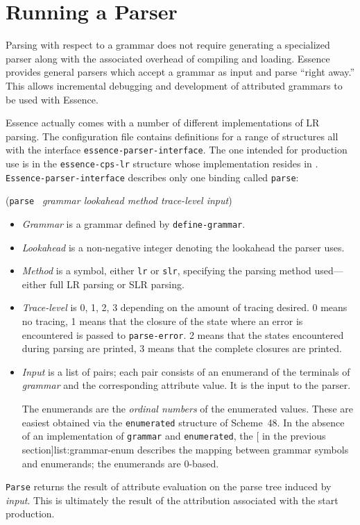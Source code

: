 \documentclass{article}
\renewcommand{\var}[1]{\noindent\mbox{\textit{#1}}}
\newcommand{\ide}[1]{{\frenchspacing\textnormal{\texttt{#1}}}}
\newcommand{\pproto}[2]{\unskip%
\mbox{\texonly{\spaceskip=0.5em}#1}%
\mbox{ }\texonly{\nobreak}\htmlonly{ }\textrm{#2}}
\newcommand{\proto}[3]{\par\bigskip\begin{flushleft}\pproto{(\texttt{#1}}{\textit{#2})}\hspace*{\fill}{#3}\end{flushleft}}
\newcommand{\codefont}[1]{\texttt{#1}}
\begin{document}
\section{Running a Parser}
\label{sec:running-a-parser}

Parsing with respect to a grammar does not require generating a
specialized parser along with the associated overhead of compiling and
loading.  Essence provides general parsers which accept a grammar as
input and parse ``right away.''  This allows incremental debugging and 
development of attributed grammars to be used with Essence.

Essence actually comes with a number of different implementations of
LR parsing.  The  configuration file contains
definitions for a range of structures all with the interface
\codefont{essence-parser-interface}.  The one intended for production use is in the
\codefont{essence-cps-lr} structure whose implementation resides in
.  \codefont{Essence-parser-interface} describes only 
one binding called \codefont{parse}:

\label{proc:parse}
\proto{parse}{grammar lookahead method trace-level input}{procedure}
%
\begin{itemize}
\item \var{Grammar} is a grammar defined by \codefont{define-grammar}.
\item \var{Lookahead} is a non-negative integer denoting the
  lookahead the parser uses.
\item \var{Method} is a symbol, either \codefont{lr} or
  \codefont{slr}, specifying the parsing method used---either full LR
  parsing or SLR parsing.
\item \var{Trace-level} is 0, 1, 2, 3 depending on the amount of
  tracing desired.  0 means no tracing, 1 means that the closure of
  the state where an error is encountered is passed to
  \ide{parse-error}.  2 means that the states encountered during
  parsing are printed, 3 means that the complete closures are printed.
\item \var{Input} is a list of pairs; each pair consists of an
  enumerand of the terminals of \var{grammar} and the corresponding attribute value.  It is the
  input to the parser. 
  
  The enumerands are the \emph{ordinal numbers} of the enumerated
  values.  These are easiest obtained via the \codefont{enumerated} structure
  of Scheme~48.  In the absence of an implementation of \codefont{grammar} and
  \codefont{enumerated}, the [ in the previous
  section]{list:grammar-enum} describes the mapping between grammar symbols and
  enumerands; the enumerands are 0-based.
\end{itemize}
%
\ide{Parse} returns the result of attribute evaluation on the parse
tree induced by \var{input}.  This is ultimately the result of the
attribution associated with the start production.
\end{document}
